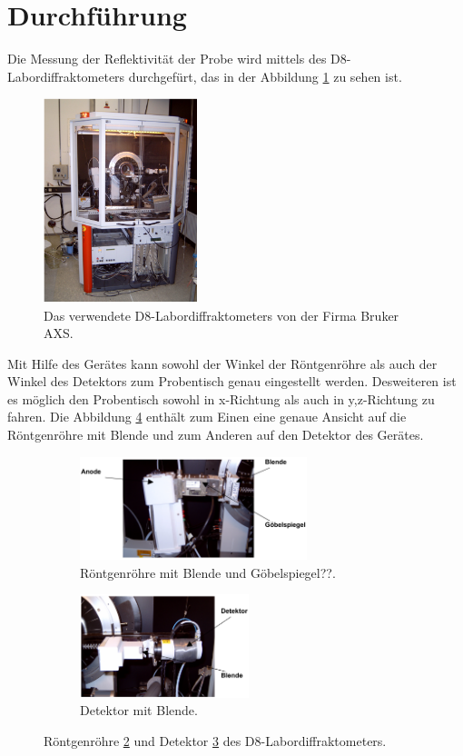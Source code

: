 \section{Durchführung}
\label{sec:Durchführung}
Die Messung der Reflektivität der Probe wird mittels
des D8-Labordiffraktometers
durchgefürt, das in der Abbildung \ref{fig:app} zu sehen ist.
\begin{figure}
  \centering
  \includegraphics[width=0.4\textwidth]{bilder/apparatur.PNG}
  \caption{Das verwendete D8-Labordiffraktometers von der Firma Bruker AXS. \cite{sample}}
  \label{fig:app}
\end{figure}

Mit Hilfe des Gerätes kann sowohl der
Winkel der Röntgenröhre
als auch der Winkel des Detektors zum Probentisch
genau eingestellt werden. Desweiteren ist es
möglich den Probentisch sowohl in x-Richtung als auch in
y,z-Richtung zu fahren.
Die Abbildung \ref{fig:anode_det} enthält zum Einen eine genaue Ansicht auf die
Röntgenröhre mit Blende und zum Anderen auf den Detektor des Gerätes.

\begin{figure}
  \centering
  \begin{subfigure}{0.59\textwidth}
  \includegraphics[height=3cm]{bilder/anode.PNG}
  \caption{Röntgenröhre mit Blende und Göbelspiegel??.}
  \label{fig:anode}
\end{subfigure}
\begin{subfigure}{0.39\textwidth}
\includegraphics[height=3cm]{bilder/detektor.PNG}
\caption{Detektor mit Blende.}
\label{fig:det}
\end{subfigure}
\caption{Röntgenröhre \ref{fig:anode} und Detektor \ref{fig:det} des D8-Labordiffraktometers. \cite{sample}}
\label{fig:anode_det}
\end{figure}


